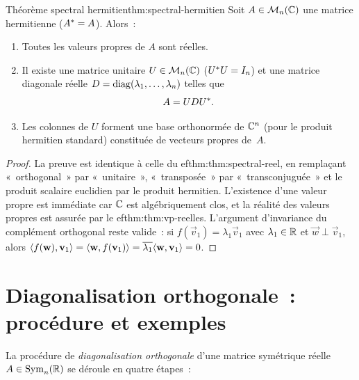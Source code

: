 \begin{theorem}{Théorème spectral hermitien}{thm:spectral-hermitien}
  Soit $A \in \mathcal{M}_n({\mathbb{C}})$ une matrice hermitienne
  (${A}^{*} = A$). Alors~:
  \begin{enumerate}[label=(\roman*)]
    \item Toutes les valeurs propres de $A$ sont réelles.
    \item Il existe une matrice unitaire
      $U \in \mathcal{M}_n({\mathbb{C}})$ (${U}^{*}U = I_n$) et une matrice diagonale
      réelle $D = \operatorname{diag}(\lambda_1, \ldots, \lambda_n)$ telles que
      \[
        A = U D {U}^{*}.
      \]
    \item Les colonnes de $U$ forment une base orthonormée de ${\mathbb{C}}^n$
      (pour le produit hermitien standard) constituée de vecteurs propres
      de~$A$.
  \end{enumerate}
\end{theorem}

\begin{proof}
  La preuve est identique à celle du 
ef{thm:thm:spectral-reel}, en
  remplaçant «~orthogonal~» par «~unitaire~», «~transposée~» par
  «~transconjuguée~» et le produit scalaire euclidien par le produit
  hermitien. L'existence d'une valeur propre est immédiate car ${\mathbb{C}}$ est
  algébriquement clos, et la réalité des valeurs propres est assurée par
  le 
ef{thm:thm:vp-reelles}. L'argument d'invariance du complément
  orthogonal reste valide~: si $f(\vec{v}_1) = \lambda_1 \vec{v}_1$
  avec $\lambda_1 \in {\mathbb{R}}$ et $\vec{w} \perp \vec{v}_1$, alors
  $\langle f(\mathbf{w}), \mathbf{v}_1\rangle = \langle\mathbf{w}, f(\mathbf{v}_1)\rangle
  = \overline{\lambda_1}\langle\mathbf{w}, \mathbf{v}_1\rangle = 0$.
\end{proof}

\section{Diagonalisation orthogonale~: procédure et exemples}%
\label{sec:diag-ortho}

La procédure de \emph{diagonalisation orthogonale}
d'une matrice symétrique réelle $A \in \operatorname{Sym}_n({\mathbb{R}})$ se déroule en
quatre étapes~:

